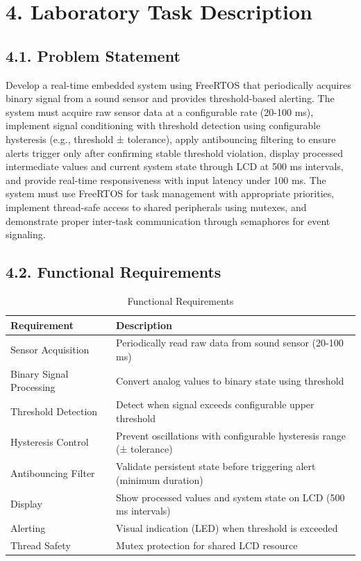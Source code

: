 \documentclass[12pt]{article}
\begin{document}
\section*{4. Laboratory Task Description}

\subsection*{4.1. Problem Statement}

Develop a real-time embedded system using FreeRTOS that periodically acquires binary signal from a sound sensor and provides threshold-based alerting. The system must acquire raw sensor data at a configurable rate (20-100 ms), implement signal conditioning with threshold detection using configurable hysteresis (e.g., threshold ± tolerance), apply antibouncing filtering to ensure alerts trigger only after confirming stable threshold violation, display processed intermediate values and current system state through LCD at 500 ms intervals, and provide real-time responsiveness with input latency under 100 ms. The system must use FreeRTOS for task management with appropriate priorities, implement thread-safe access to shared peripherals using mutexes, and demonstrate proper inter-task communication through semaphores for event signaling.

\subsection*{4.2. Functional Requirements}

\begin{table}[H]
	\centering
	\caption{Functional Requirements}
	\label{tab:functional-requirements}
	\begin{tabular}{|l|l|}
		\hline
		\textbf{Requirement} & \textbf{Description} \\
		\hline
		Sensor Acquisition & Periodically read raw data from sound sensor (20-100 ms) \\
		\hline
		Binary Signal Processing & Convert analog values to binary state using threshold \\
		\hline
		Threshold Detection & Detect when signal exceeds configurable upper threshold \\
		\hline
		Hysteresis Control & Prevent oscillations with configurable hysteresis range (± tolerance) \\
		\hline
		Antibouncing Filter & Validate persistent state before triggering alert (minimum duration) \\
		\hline
		Display & Show processed values and system state on LCD (500 ms intervals) \\
		\hline
		Alerting & Visual indication (LED) when threshold is exceeded \\
		\hline
		Thread Safety & Mutex protection for shared LCD resource \\
		\hline
	\end{tabular}
\end{table}
\end{document}

